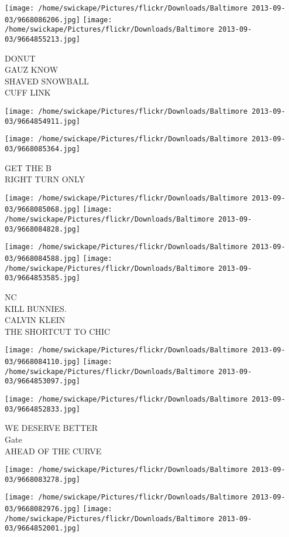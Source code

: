 \documentclass[10pt,letterpaper]{article}
\begin{document}
\texttt{[image: /home/swickape/Pictures/flickr/Downloads/Baltimore 2013-09-03/9668086206.jpg]}
\texttt{[image: /home/swickape/Pictures/flickr/Downloads/Baltimore 2013-09-03/9664855213.jpg]}

DONUT\\
GAUZ KNOW\\
SHAVED SNOWBALL\\
CUFF LINK
\pagebreak

\texttt{[image: /home/swickape/Pictures/flickr/Downloads/Baltimore 2013-09-03/9664854911.jpg]}

\vspace{0.25in}
\texttt{[image: /home/swickape/Pictures/flickr/Downloads/Baltimore 2013-09-03/9668085364.jpg]}

GET THE B\\
RIGHT TURN ONLY
\pagebreak

\texttt{[image: /home/swickape/Pictures/flickr/Downloads/Baltimore 2013-09-03/9668085068.jpg]}
\texttt{[image: /home/swickape/Pictures/flickr/Downloads/Baltimore 2013-09-03/9668084828.jpg]}

\texttt{[image: /home/swickape/Pictures/flickr/Downloads/Baltimore 2013-09-03/9668084588.jpg]}
\texttt{[image: /home/swickape/Pictures/flickr/Downloads/Baltimore 2013-09-03/9664853585.jpg]}

NC\\
KILL BUNNIES.\\
CALVIN KLEIN\\
THE SHORTCUT TO CHIC
\pagebreak

\texttt{[image: /home/swickape/Pictures/flickr/Downloads/Baltimore 2013-09-03/9668084110.jpg]}
\texttt{[image: /home/swickape/Pictures/flickr/Downloads/Baltimore 2013-09-03/9664853097.jpg]}

\texttt{[image: /home/swickape/Pictures/flickr/Downloads/Baltimore 2013-09-03/9664852833.jpg]}

WE DESERVE BETTER\\
Gate\\
AHEAD OF THE CURVE
\pagebreak

\texttt{[image: /home/swickape/Pictures/flickr/Downloads/Baltimore 2013-09-03/9668083278.jpg]}

\vspace{0.25in}
\texttt{[image: /home/swickape/Pictures/flickr/Downloads/Baltimore 2013-09-03/9668082976.jpg]}
\texttt{[image: /home/swickape/Pictures/flickr/Downloads/Baltimore 2013-09-03/9664852001.jpg]}
\end{document}
